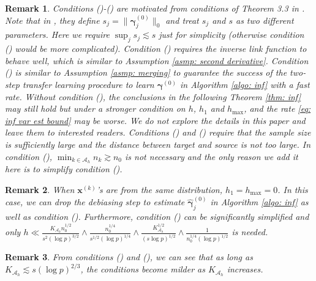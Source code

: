 \documentclass[12pt]{article}
\newcommand*{\rom}[1]{\romannumeral #1}
\newcommand{\zeronorm}[1]{\|#1\|_{0}}
\newcommand{\bgammak}[1]{\bm{\gamma}^{(#1)}}
\newcommand{\hbgammak}[1]{\hat{\bm{\gamma}}^{(#1)}}
\newcommand{\bxk}[1]{\bm{x}^{(#1)}}
\newcommand{\mah}{\mathcal{A}_h}
\newcommand{\Kah}{K_{\mah}}
\newcommand{\<}{\langle}
\renewcommand{\>}{\rangle}
\newtheorem{remark}{Remark}
\begin{document}
\begin{remark}
	Conditions (\rom{1})-(\rom{3}) are motivated from conditions of Theorem 3.3 in \cite{van2014asymptotically}. Note that in \cite{van2014asymptotically}, they define $s_j = \zeronorm{\bgammak{0}_j}$ and treat $s_j$ and $s$ as two different parameters. Here we require $\sup_j s_j \lesssim s$ just for simplicity (otherwise condition (\rom{7}) would be more complicated). Condition (\rom{4}) requires the inverse link function to behave well, which is similar to Assumption \ref{asmp: second derivative}. Condition (\rom{5}) is similar to Assumption \ref{asmp: merging} to guarantee the success of the two-step transfer learning procedure to learn $\bgammak{0}$ in Algorithm \ref{algo: inf} with a fast rate. Without condition (\rom{5}), the conclusions in the following Theorem \ref{thm: inf} may still hold but under a stronger condition on $h$, $h_1$ and $h_{\max}$, and the rate \eqref{eq: inf var est bound} may be worse. We do not explore the details in this paper and leave them to interested readers. Conditions (\rom{6}) and (\rom{7}) require that the sample size is sufficiently large and the distance between target and source is not too large. In condition (\rom{6}), $\min_{k \in \mah}n_k \gtrsim n_0$ is not necessary and the only reason we add it here is to simplify condition (\rom{7}). 
\end{remark}

\begin{remark}
	When $\bxk{k}$'s are from the same distribution, $h_1 = h_{\max} = 0$. In this case, we can drop the debiasing step to estimate $\hbgammak{0}_j$ in Algorithm \ref{algo: inf} as well as condition (\rom{5}). Furthermore, condition (\rom{7}) can be significantly simplified and only $h \ll \frac{\Kah n_0^{1/2}}{s^2(\log p)^{3/2}} \wedge \frac{n_0^{1/4}}{s^{1/2}(\log p)^{1/4}} \wedge \frac{\Kah^{1/2}}{(s\log p)^{1/2}} \wedge \frac{1}{n_0^{1/4}(\log p)^{1/2}}$ is needed.  
\end{remark}

\begin{remark}
	From conditions (\rom{6}) and (\rom{7}), we can see that as long as $\Kah \lesssim s (\log p)^{2/3}$, the conditions become milder as $\Kah$ increases.
\end{remark}
\end{document}
